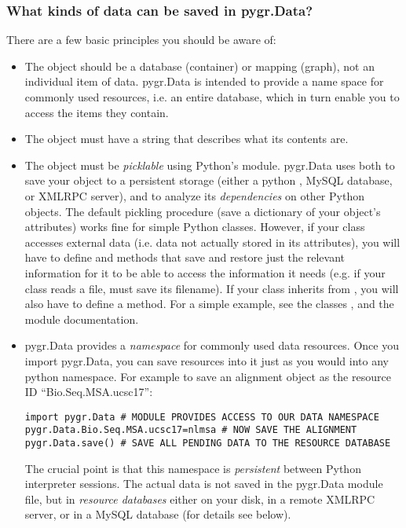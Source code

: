 \documentclass{howto}
\begin{document}
\subsubsection{What kinds of data can be saved in pygr.Data?}
There are a few basic principles you should be aware of:
\begin{itemize}
\item The object should be a database (container) or mapping (graph),
not an individual item of data.  pygr.Data is intended to provide
a name space for commonly used resources, i.e. an entire database,
which in turn enable you to access the items they contain.

\item The object must have a  string that describes
what its contents are.

\item The object must be {\em picklable} using Python's 
module.  pygr.Data uses  both to save your object to 
a persistent storage (either a python , MySQL database,
or XMLRPC server), and to analyze its {\em dependencies} on other
Python objects.  The default pickling procedure (save a dictionary of
your object's attributes) works fine for simple Python classes.
However, if your class accesses external data (i.e. data not actually
stored in its attributes), you will have to define 
and  methods that save and restore just the 
relevant information for it to be able to access the information
it needs (e.g. if your class reads a file,  must
save its filename).  If your class inherits from , you
will also have to define a  method.  For a simple
example, see the classes , and the  module documentation.

\item pygr.Data provides a {\em namespace} for commonly used data resources.
Once you import pygr.Data, you can save resources into it just as you would into
any python namespace.  For example to save an alignment object 
as the resource ID ``Bio.Seq.MSA.ucsc17'':
\begin{verbatim}
import pygr.Data # MODULE PROVIDES ACCESS TO OUR DATA NAMESPACE
pygr.Data.Bio.Seq.MSA.ucsc17=nlmsa # NOW SAVE THE ALIGNMENT
pygr.Data.save() # SAVE ALL PENDING DATA TO THE RESOURCE DATABASE
\end{verbatim}
The crucial point is that this namespace is {\em persistent} between
Python interpreter sessions.  The actual data is not saved in the pygr.Data 
module file, but in {\em resource databases} either on your disk, in
a remote XMLRPC server, or in a MySQL database (for details see below).


\end{itemize}
\end{document}
